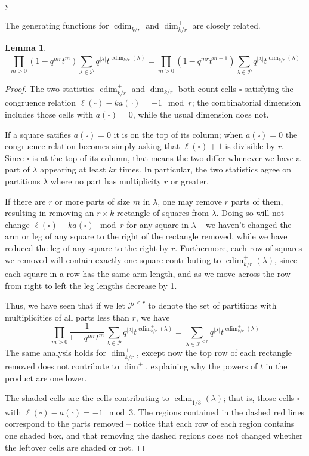 y\documentclass{amsart}[12pt]
\theoremstyle{definition}
\newtheorem{lemma}[dummy]{Lemma}
\newcommand{\PP}{\mathcal{P}} %
\DeclareMathOperator{\cdim}{cdim}
\begin{document}
The generating functions for $\cdim^+_{k/r}$ and $\dim^+_{k/r}$ are closely related.

\begin{lemma}
$$\prod_{m>0}(1-q^{mr}t^m)\sum_{\lambda\in\PP} q^{|\lambda|}t^{\cdim^+_{k/r}(\lambda)}=\prod_{m>0} (1-q^{mr}t^{m-1}) \sum_{\lambda\in\PP} q^{|\lambda|}t^{\dim^+_{k/r}(\lambda)}$$
\end{lemma}
\begin{proof}
The two statistics $\cdim^+_{k/r}$ and $\dim_{k/r}$ both count cells $\square$ satisfying the congruence relation $\ell(\square)-ka(\square)=-1\mod r$; the combinatorial dimension includes those cells with $a(\square)=0$, while the usual dimension does not.  

If a square satifies $a(\square)=0$ it is on the top of its column; when $a(\square)=0$ the congruence relation becomes simply asking that $\ell(\square)+1$ is divisible by $r$. Since $\square$ is at the top of its column, that means the two differ whenever we have a part of $\lambda$ appearing at least $kr$ times.  In particular, the two statistics agree on partitions $\lambda$ where no part has multiplicity $r$ or greater.

If there are $r$ or more parts of size $m$ in $\lambda$, one may remove $r$ parts of them, resulting in removing an $r\times k$ rectangle of squares from $\lambda$.  Doing so will not change $\ell(\square)-ka(\square)\mod r$ for any square in $\lambda$ -- we haven't changed the arm or leg of any square to the right of the rectangle removed, while we have reduced the leg of any square to the right by $r$.  Furthermore, each row of squares we removed will contain exactly one square contributing to $\cdim^+_{k/r}(\lambda)$, since each square in a row has the same arm length, and as we move across the row from right to left the leg lengths decrease by 1.  

Thus, we have seen that if we let $\PP^{<r}$ to denote the set of partitions with multiplicities of all parts less than $r$, we have
$$\prod_{m>0}\frac{1}{1-q^{mr}t^m}\sum_{\lambda\in\PP} q^{|\lambda|}t^{\cdim^+_{k/r}(\lambda)}=\sum_{\lambda\in\PP^{<r}}q^{|\lambda|}t^{\cdim^+_{k/r}(\lambda)}$$
The same analysis holds for $\dim^+_{k/r}$, except now the top row of each rectangle removed does not contribute to $\dim^+$, explaining why the powers of $t$ in the product are one lower.

The shaded cells are the cells contributing to $\cdim^+_{1/3}(\lambda)$; that is, those cells $\square$ with $\ell(\square)-a(\square)=-1\mod 3$.  The regions contained in the dashed red lines correspond to the parts removed -- notice that each row of each region contains one shaded box, and that removing the dashed regions does not changed whether the leftover cells are shaded or not.



\end{proof}
\end{document}
